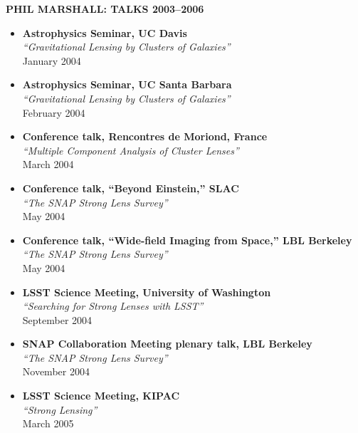 
\begin{center}
{\bf \Large P{\large HIL} M{\large ARSHALL}: T{\large ALKS} 2003--2006}
\end{center}

\begin{itemize}
 
\item{\textbf{Astrophysics Seminar, UC Davis}\\
\textit{``Gravitational Lensing by Clusters of Galaxies''}\\
January 2004
}

\item{\textbf{Astrophysics Seminar, UC Santa Barbara}\\
\textit{``Gravitational Lensing by Clusters of Galaxies''}\\
February 2004
}

\item{\textbf{Conference talk, Rencontres de Moriond, France}\\
\textit{``Multiple Component Analysis of Cluster Lenses''}\\
March 2004
}

\item{\textbf{Conference talk, ``Beyond Einstein,'' SLAC}\\
\textit{``The SNAP Strong Lens Survey''}\\
May 2004
}

\item{\textbf{Conference talk, ``Wide-field Imaging from Space,'' LBL Berkeley}\\
\textit{``The SNAP Strong Lens Survey''}\\
May 2004
}

\item{\textbf{LSST Science Meeting, University of Washington}\\
\textit{``Searching for Strong Lenses with LSST''}\\
September 2004
}

\item{\textbf{SNAP Collaboration Meeting plenary talk, LBL Berkeley}\\
\textit{``The SNAP Strong Lens Survey''}\\
November 2004
}

\item{\textbf{LSST Science Meeting, KIPAC}\\
\textit{``Strong Lensing''}\\
March 2005
}


\end{itemize}
